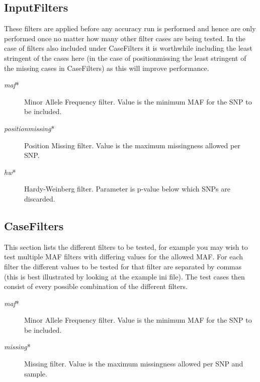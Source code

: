 \documentclass[10pt]{report}
\begin{document}
\subsection{InputFilters}
These filters are applied before any accuracy run is performed and hence are only performed once no matter how many other filter cases are being tested.  In the case of filters also included under CaseFilters it is worthwhile including the least stringent of the cases here (in the case of positionmissing the least stringent of the missing cases in CaseFilters) as this will improve performance.
\begin{description}
\item[\emph{maf}*] Minor Allele Frequency filter.  Value is the minimum MAF for the SNP to be included.
\item[\emph{positionmissing}*] Position Missing filter. Value is the maximum missingness allowed per SNP.
\item[\emph{hw}*]Hardy-Weinberg filter. Parameter is p-value below which SNPs are discarded.
\end{description}

\subsection{CaseFilters}
This section lists the different filters to be tested, for example you may wish to test multiple MAF filters with differing values for the allowed MAF.  For each filter the different values to be tested for that filter are separated by commas (this is best illustrated by looking at the example ini file).  The test cases then consist of every possible combination of the different filters.
\begin{description}
\item[\emph{maf}*] Minor Allele Frequency filter.  Value is the minimum MAF for the SNP to be included.
\item[\emph{missing}*] Missing filter.  Value is the maximum missingness allowed per SNP and sample.
\end{description}
\end{document}
